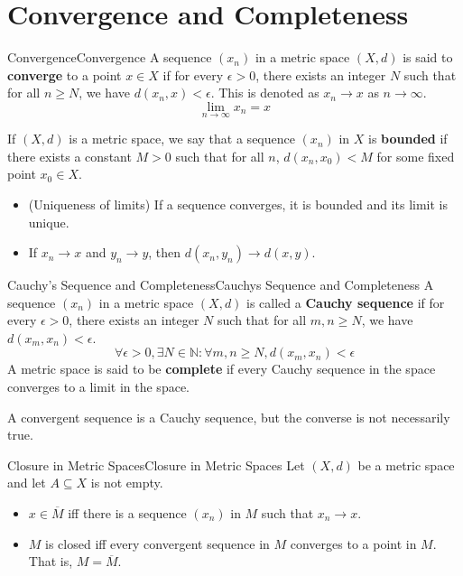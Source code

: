 \documentclass[../main.tex]{subfiles}
\begin{document}
\section{Convergence and Completeness}

\begin{definition}{Convergence}{Convergence}
	A sequence $(x_n)$ in a metric space $(X, d)$ is said to \textbf{converge} to a point $x \in X$ if for every $\epsilon > 0$, there exists an integer $N$ such that for all $n \geq N$, we have $d(x_n, x) < \epsilon$. This is denoted as $x_n \to x$ as $n \to \infty$.
	\begin{equation*}
		\lim_{n \to \infty} x_n = x
	\end{equation*}
\end{definition}

If $(X,d)$ is a metric space, we say that a sequence $(x_n)$ in $X$ is \textbf{bounded} if there exists a constant $M > 0$ such that for all $n$, $d(x_n, x_0) < M$ for some fixed point $x_0 \in X$.
\begin{itemize}
\item (Uniqueness of limits) If a sequence converges, it is bounded and its limit is unique.
\item If $x_n \rightarrow x$ and $y_n \rightarrow y$, then $d(x_n, y_n) \rightarrow d(x, y)$.
\end{itemize}

\begin{definition}{Cauchy's Sequence and Completeness}{Cauchys Sequence and Completeness}
	A sequence $(x_n)$ in a metric space $(X, d)$ is called a \textbf{Cauchy sequence} if for every $\epsilon > 0$, there exists an integer $N$ such that for all $m, n \geq N$, we have $d(x_m, x_n) < \epsilon$.
	\begin{equation*}
		\forall \epsilon > 0, \exists N \in \mathbb{N} : \forall m, n \geq N, d(x_m, x_n) < \epsilon
	\end{equation*}
	A metric space is said to be \textbf{complete} if every Cauchy sequence in the space converges to a limit in the space.
\end{definition}
A convergent sequence is a Cauchy sequence, but the converse is not necessarily true. 

\begin{theorem}{Closure in Metric Spaces}{Closure in Metric Spaces}
	Let $(X, d)$ be a metric space and let $A \subseteq X$ is not empty.
	\begin{itemize}
	\item $x\in \overline{M}$ iff there is a sequence $(x_n)$ in $M$ such that $x_n \to x$.
	\item $M$ is closed iff every convergent sequence in $M$ converges to a point in $M$. That is, $M = \overline{M}$.
	\end{itemize}
\end{theorem}
\end{document}
